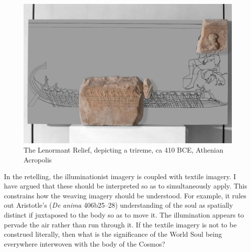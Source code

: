 \begin{figure}[htbp]
     \centering
         \includegraphics[scale=1.3]{graphics/trireme.jpg}
	 \caption{The Lenormant Relief, depicting a trireme, ca 410 BCE, Athenian Acropolis}
     \label{fig:trireme}
\end{figure}

In the retelling, the illuminationist imagery is coupled with textile imagery. I have argued that these should be interpreted so as to simultaneously apply. This constrains how the weaving imagery should be understood. For example, it rules out Aristotle's (\emph{De anima} 406b25--28) understanding of the soul as spatially distinct if juxtaposed to the body so as to move it. The illumination appears to pervade the air rather than run through it. If the textile imagery is not to be construed literally, then what is the significance of the World Soul being everywhere interwoven with the body of the Cosmos?

